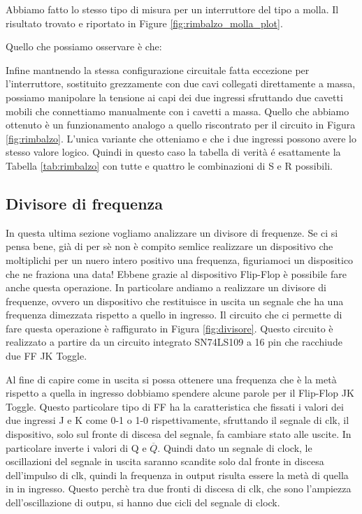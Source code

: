 Abbiamo fatto lo stesso tipo di misura per un interruttore del tipo a molla. Il risultato trovato e riportato in Figure \ref{fig:rimbalzo_molla_plot}.

Quello che possiamo osservare è che:

Infine mantnendo la stessa configurazione circuitale fatta eccezione per l'interruttore, sostituito grezzamente con due cavi collegati direttamente a massa, possiamo manipolare la tensione ai capi dei due ingressi sfruttando due cavetti mobili che connettiamo manualmente con i cavetti a massa.
Quello che abbiamo ottenuto è un funzionamento analogo a quello riscontrato per il circuito in Figura \ref{fig:rimbalzo}.
L'unica variante che otteniamo e che i due ingressi possono avere lo stesso valore logico. Quindi in questo caso la tabella di verità é esattamente la Tabella \ref{tab:rimbalzo} con tutte e quattro le combinazioni di S e R possibili. 

\subsection*{Divisore di frequenza}

In questa ultima sezione vogliamo analizzare un divisore di frequenze. Se ci si pensa bene, già di per sè non è compito semlice realizzare un dispositivo che moltiplichi per un nuero intero positivo una frequenza, figuriamoci un dispositico che ne fraziona una data!
Ebbene grazie al dispositivo Flip-Flop è possibile fare anche questa operazione. In particolare andiamo a realizzare un divisore di frequenze, ovvero un dispositivo che restituisce in uscita un segnale che ha una frequenza dimezzata rispetto a quello in ingresso.
Il circuito che ci permette di fare questa operazione è raffigurato in Figura \ref{fig:divisore}. Questo circuito è realizzato a partire da un circuito integrato SN74LS109 a 16 pin che racchiude due FF JK Toggle.

Al fine di capire come in uscita si possa ottenere una frequenza che è la metà rispetto a quella in ingresso dobbiamo spendere alcune parole per il Flip-Flop JK Toggle. Questo particolare tipo di FF ha la caratteristica che fissati i valori dei due ingressi J e K come 0-1 o 1-0 rispettivamente, sfruttando il segnale di clk, il dispositivo, solo sul fronte di discesa del segnale, fa cambiare stato alle uscite. In particolare inverte i valori di Q e $\overline{Q}$. Quindi dato un segnale di clock, le oscillazioni del segnale in uscita saranno scandite solo dal fronte in discesa dell'impulso di clk, quindi la frequenza in output risulta essere la metà di quella in in ingresso. Questo perchè tra due fronti di discesa di clk, che sono l'ampiezza dell'oscillazione di outpu, si hanno due cicli del segnale di clock.

